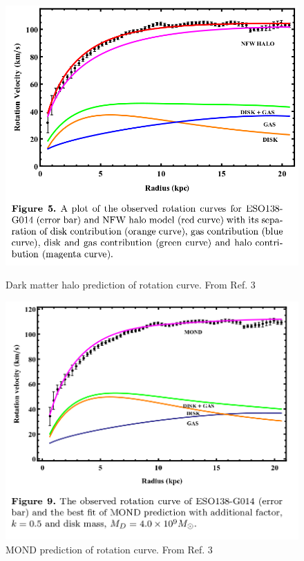 \documentclass{article}
\begin{document}
\begin{figure}[h]
\begin{minipage}[b]{.5\textwidth}
\begin{center}
\includegraphics[width=\textwidth,angle=0.]{rcDarkMatter.png}
\end{center}
\caption{Dark matter halo prediction of rotation curve. From Ref. 3}
\end{minipage}
\hfill
\begin{minipage}[b]{.5\textwidth}
\begin{center}
\includegraphics[width=\textwidth,angle=0.]{mond.png}
\end{center}
\caption{MOND prediction of rotation curve. From Ref. 3}
\end{minipage}
\end{figure}
\end{document}
